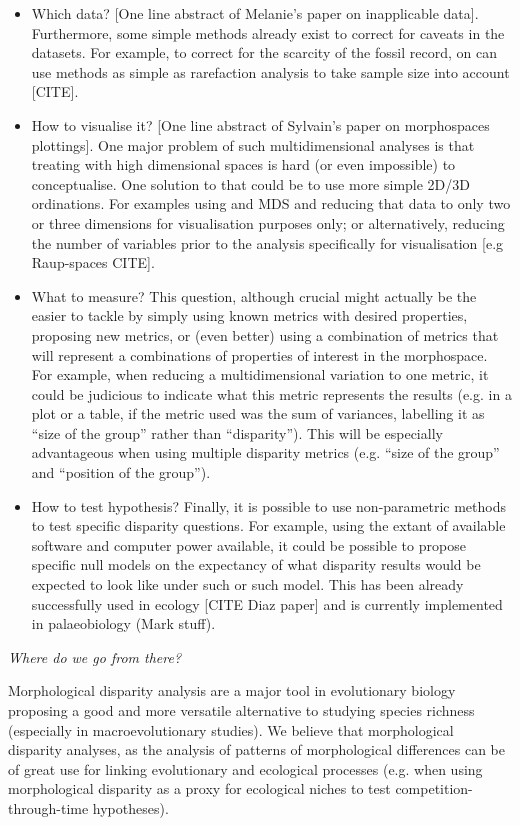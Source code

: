 \documentclass[12pt,letterpaper]{article}
\renewcommand{\subsection}[1]{%
\bigskip
\begin{center}
\begin{large}
\normalfont\itshape #1
\end{large}
\end{center}}
\begin{document}
\begin{itemize}
    \item{Which data?}
    [One line abstract of Melanie's paper on inapplicable data].
    Furthermore, some simple methods already exist to correct for caveats in the datasets. 
    For example, to correct for the scarcity of the fossil record, on can use methods as simple as rarefaction analysis to take sample size into account [CITE].
    \item{How to visualise it?}
    [One line abstract of Sylvain's paper on morphospaces plottings].
    One major problem of such multidimensional analyses is that treating with high dimensional spaces is hard (or even impossible) to conceptualise.
    One solution to that could be to use more simple 2D/3D ordinations.
    For examples using and MDS and reducing that data to only two or three dimensions for visualisation purposes only; or alternatively, reducing the number of variables prior to the analysis specifically for visualisation [e.g Raup-spaces CITE].
    \item{What to measure?}
    This question, although crucial might actually be the easier to tackle by simply using known metrics with desired properties, proposing new metrics, or (even better) using a combination of metrics that will represent a combinations of properties of interest in the morphospace.
    For example, when reducing a multidimensional variation to one metric, it could be judicious to indicate what this metric represents the results (e.g. in a plot or a table, if the metric used was the sum of variances, labelling it as ``size of the group'' rather than ``disparity'').
    This will be especially advantageous when using multiple disparity metrics (e.g. ``size of the group'' and ``position of the group'').
    \item{How to test hypothesis?}
    Finally, it is possible to use non-parametric methods to test specific disparity questions.
    For example, using the extant of available software and computer power available, it could be possible to propose specific null models on the expectancy of what disparity results would be expected to look like under such or such model.
    This has been already successfully used in ecology [CITE Diaz paper] and is currently implemented in palaeobiology (Mark stuff).
\end{itemize}


\subsection{Where do we go from there?}
Morphological disparity analysis are a major tool in evolutionary biology proposing a good and more versatile alternative to studying species richness (especially in macroevolutionary studies).
We believe that morphological disparity analyses, as the analysis of patterns of morphological differences can be of great use for linking evolutionary and ecological processes (e.g. when using morphological disparity as a proxy for ecological niches to test competition-through-time hypotheses).
\end{document}

